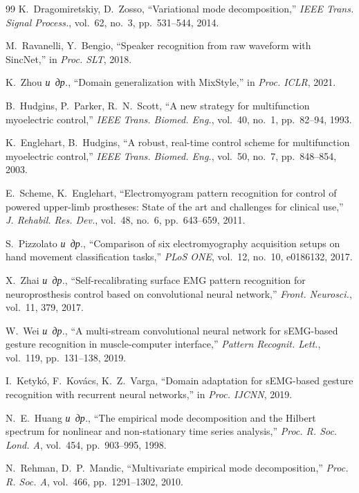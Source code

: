 \documentclass[conference]{IEEEtran}
\newcommand{\etal}{\mbox{\textit{и~др.}}}
\begin{document}
\begin{thebibliography}{99}
K.~Dragomiretskiy, D.~Zosso, ``Variational mode decomposition,'' \textit{IEEE Trans. Signal Process.}, vol.~62, no.~3, pp.~531--544, 2014.

M.~Ravanelli, Y.~Bengio, ``Speaker recognition from raw waveform with SincNet,'' in \textit{Proc. SLT}, 2018.

K.~Zhou \etal, ``Domain generalization with MixStyle,'' in \textit{Proc. ICLR}, 2021.

B.~Hudgins, P.~Parker, R.~N.~Scott, ``A new strategy for multifunction myoelectric control,'' \textit{IEEE Trans. Biomed. Eng.}, vol.~40, no.~1, pp.~82--94, 1993.

K.~Englehart, B.~Hudgins, ``A robust, real-time control scheme for multifunction myoelectric control,'' \textit{IEEE Trans. Biomed. Eng.}, vol.~50, no.~7, pp.~848--854, 2003.

E.~Scheme, K.~Englehart, ``Electromyogram pattern recognition for control of powered upper-limb prostheses: State of the art and challenges for clinical use,'' \textit{J. Rehabil. Res. Dev.}, vol.~48, no.~6, pp.~643--659, 2011.

S.~Pizzolato \etal, ``Comparison of six electromyography acquisition setups on hand movement classification tasks,'' \textit{PLoS ONE}, vol.~12, no.~10, e0186132, 2017.

X.~Zhai \etal, ``Self-recalibrating surface EMG pattern recognition for neuroprosthesis control based on convolutional neural network,'' \textit{Front. Neurosci.}, vol.~11, 379, 2017.

W.~Wei \etal, ``A multi-stream convolutional neural network for sEMG-based gesture recognition in muscle-computer interface,'' \textit{Pattern Recognit. Lett.}, vol.~119, pp.~131--138, 2019.

I.~Ketyk\'{o}, F.~Kov\'{a}cs, K.~Z.~Varga, ``Domain adaptation for sEMG-based gesture recognition with recurrent neural networks,'' in \textit{Proc. IJCNN}, 2019.

N.~E.~Huang \etal, ``The empirical mode decomposition and the Hilbert spectrum for nonlinear and non-stationary time series analysis,'' \textit{Proc. R. Soc. Lond. A}, vol.~454, pp.~903--995, 1998.

N.~Rehman, D.~P.~Mandic, ``Multivariate empirical mode decomposition,'' \textit{Proc. R. Soc. A}, vol.~466, pp.~1291--1302, 2010.


\end{thebibliography}
\end{document}
